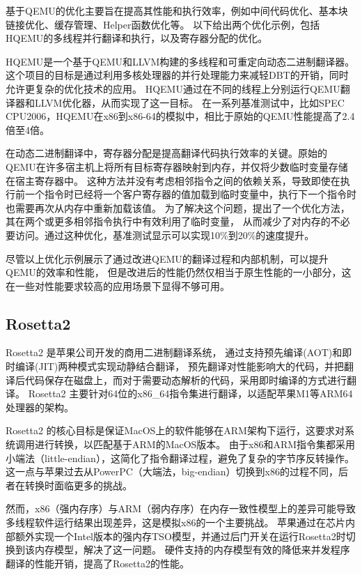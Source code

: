 基于QEMU的优化主要旨在提高其性能和执行效率，例如中间代码优化\cite{LiNan2021}、基本块链接优化\cite{Hong2012HQEMUAM}、缓存管理\cite{FengYue2010}、Helper函数优化\cite{Wang2021}等。
以下给出两个优化示例，包括HQEMU的多线程并行翻译和执行，以及寄存器分配的优化。

HQEMU\cite{Hong2012HQEMUAM}是一个基于QEMU和LLVM构建的多线程和可重定向动态二进制翻译器。
这个项目的目标是通过利用多核处理器的并行处理能力来减轻DBT的开销，同时允许更复杂的优化技术的应用。
HQEMU通过在不同的线程上分别运行QEMU翻译器和LLVM优化器，从而实现了这一目标。
在一系列基准测试中，比如SPEC CPU2006，HQEMU在x86到x86-64的模拟中，相比于原始的QEMU性能提高了2.4倍至4倍。

在动态二进制翻译中，寄存器分配是提高翻译代码执行效率的关键。原始的QEMU在许多宿主机上将所有目标寄存器映射到内存，并仅将少数临时变量存储在宿主寄存器中。
这种方法并没有考虑相邻指令之间的依赖关系，导致即使在执行前一个指令时已经将一个客户寄存器的值加载到临时变量中，执行下一个指令时也需要再次从内存中重新加载该值。
为了解决这个问题，\cite{Hong2012HQEMUAM}提出了一个优化方法，其在两个或更多相邻指令执行中有效利用了临时变量，
从而减少了对内存的不必要访问。通过这种优化，基准测试显示可以实现10\%到20\%的速度提升。

尽管以上优化示例展示了通过改进QEMU的翻译过程和内部机制，可以提升QEMU的效率和性能，
但是改进后的性能仍然仅相当于原生性能的一小部分，这在一些对性能要求较高的应用场景下显得不够可用。


\subsection{Rosetta2}

Rosetta2 是苹果公司开发的商用二进制翻译系统，
通过支持预先编译(AOT)和即时编译(JIT)两种模式实现动静结合翻译，
预先翻译对性能影响大的代码，并把翻译后代码保存在磁盘上，而对于需要动态解析的代码，采用即时编译的方式进行翻译。
Rosetta2 主要针对64位的x86\_64指令集进行翻译，以适配苹果M1等ARM64处理器的架构。

Rosetta2 的核心目标是保证MacOS上的软件能够在ARM架构下运行，这要求对系统调用进行转换，以匹配基于ARM的MacOS版本。
由于x86和ARM指令集都采用小端法（little-endian），这简化了指令翻译过程，避免了复杂的字节序反转操作。
这一点与苹果过去从PowerPC（大端法，big-endian）切换到x86的过程不同，后者在转换时面临更多的挑战。

然而，x86（强内存序）与ARM（弱内存序）在内存一致性模型上的差异可能导致多线程软件运行结果出现差异，这是模拟x86的一个主要挑战\cite{Risotto}。
苹果通过在芯片内部额外实现一个Intel版本的强内存TSO模型，并通过后门开关在运行Rosetta2时切换到该内存模型，解决了这一问题。
硬件支持的内存模型有效的降低来并发程序翻译的性能开销，提高了Rosetta2的性能。

